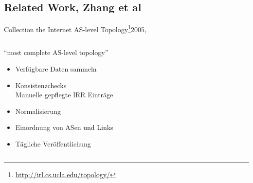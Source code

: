 \documentclass[ngerman,compress,hyperref={bookmarks}]{beamer}
\begin{document}
\subsection{Related Work, Zhang et al}
\begin{frame}{Collection the Internet AS-level Topology\footnote{\url{http://irl.cs.ucla.edu/topology/}}}{2005, \cite{Zhang:2005:CIA:1052812.1052825}}
  \begin{columns}[c]
    \begin{column}{0.5\textwidth}
      ``most complete AS-level topology''
      \begin{itemize}
        \item Verfügbare Daten sammeln
        \item Konsistenzchecks\\{\scriptsize Manuelle gepflegte IRR Einträge}
        \item Normalisierung
        \item Einordnung von ASen und Links
        \item Tägliche Veröffentlichung
      \end{itemize}
      \vspace{1cm}
    \end{column}
    \begin{column}{0.08\textwidth}
      \begin{figure}
        \label{zhang_et_al}

\end{figure}
\end{column}
\end{columns}
\end{frame}
\end{document}
